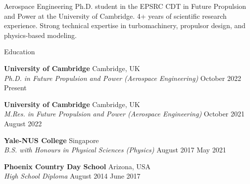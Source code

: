 \documentclass{resume} %
\begin{document}

\begin{center}
    Aerospace Engineering Ph.D. student in the EPSRC CDT in Future Propulsion and Power at the University of Cambridge. 4+ years of scientific research experience. Strong technical expertise in turbomachinery, propulsor design, and physics-based modeling.  
\end{center}





\begin{rSection}{Education}

{\bf \large  University of Cambridge} \hfill {Cambridge, UK}\\
{\em Ph.D. in Future Propulsion and Power (Aerospace Engineering)} \hfill { October 2022 {\textendash}  Present }

{\bf \large  University of Cambridge} \hfill {Cambridge, UK}\\
{\em M.Res. in Future Propulsion and Power (Aerospace Engineering)} \hfill { October 2021 {\textendash}  August 2022 }


{\bf \large  Yale-NUS College} \hfill { Singapore}\\
{\em B.S. with Honours in Physical Sciences (Physics)} \hfill { August 2017 {\textendash}  May 2021 }



{\bf \large  Phoenix Country Day School} \hfill { Arizona, USA}\\
{\em High School Diploma} \hfill { August 2014 {\textendash}  June 2017}




\end{rSection}


\end{document}
